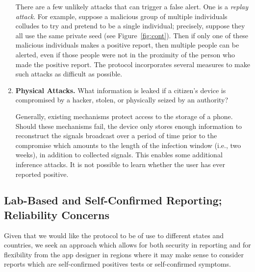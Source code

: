 \documentclass{article}
\begin{document}
\begin{enumerate}[leftmargin=*]
    There are a few unlikely attacks that can trigger a false alert. 
    One is a {\em replay attack}. For example, suppose a malicious group of multiple individuals colludes to try and pretend to be a single individual; precisely, suppose they all use the same private seed (see Figure~\ref{fig:cont}).  Then if only one of these malicious individuals makes a positive report, then multiple people can be alerted, even if those people were not in the proximity of the person who made the positive report.  The protocol incorporates several measures to make such attacks as difficult as possible. 
    
    
    \item \textbf{Physical Attacks.} What information is leaked if a citizen's device is compromised by a hacker, stolen, or physically seized by an authority?
    
    Generally, existing mechanisms protect access to the storage of a phone. Should these mechanisms fail, the device only stores enough information to reconstruct the signals broadcast over a period of time prior to the compromise which amounts  to the length of the infection window (i.e., two weeks), in addition to collected signals. This enables some additional inference attacks. It is not possible to learn whether the user has ever reported positive. 

\end{enumerate}



\subsection{Lab-Based and Self-Confirmed Reporting; Reliability Concerns} \label{sect:lab}
Given that we would like the protocol to be of use to different states and countries, we seek an approach which allows for both security in reporting and for flexibility from the app designer in regions where it may make sense to  consider reports which are self-confirmed positives tests or self-confirmed symptoms.
\end{document}
